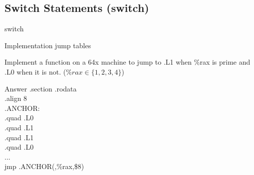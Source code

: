 \documentclass{beamer}
\begin{document}
        \subsection{Switch Statements (switch)}
            \begin{frame}{switch}
                \begin{block}{Implementation}
                    jump tables
                \end{block}
                \begin{example}
                    Implement a function on a 64x machine to jump to .L1 when \%rax is prime and .L0 when it is not. ($\%rax \in \{1,2,3,4\}$) 
                \end{example}
                \begin{block}{Answer}
                    .section .rodata\\
                    .align 8\\
                    .ANCHOR:\\
                    .quad .L0\\
                    .quad .L1\\
                    .quad .L1\\
                    .quad .L0\\
                    ...\\
                    jmp .ANCHOR(,\%rax,\$8)
                \end{block}
            \end{frame}
\end{document}
